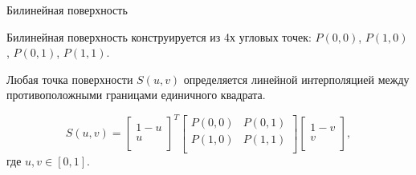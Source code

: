 \documentclass{beamer}
\begin{document}
	\begin{frame}{Билинейная поверхность}
		
		Билинейная поверхность конструируется из 4х угловых точек:
		$P(0,0)$, $P(1,0)$, $P(0,1)$, $P(1,1)$.
		
		Любая точка поверхности $S(u,v)$ определяется линейной интерполяцией между противоположными границами единичного квадрата.

		\[
			S(u,v) = 
			\begin{bmatrix}
				1-u \\
				u \\
			\end{bmatrix}^T
			\begin{bmatrix}
				P(0,0) & P(0,1) \\
				P(1,0) & P(1,1) \\
			\end{bmatrix}
			\begin{bmatrix}
				1-v \\
				v \\
			\end{bmatrix}
			,
		\]
		где $u,v \in [0,1]$.

		

	\end{frame}
\end{document}
